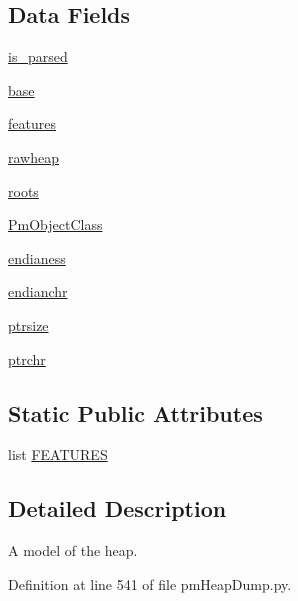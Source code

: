 \subsection*{Data Fields}
\begin{DoxyCompactItemize}
\item 
\hyperlink{classpm_heap_dump_1_1_pm_heap_a5eb881fccaa694956ede34deb4cd785c}{is\-\_\-parsed}
\item 
\hyperlink{classpm_heap_dump_1_1_pm_heap_a57ad2b4276dd1dd0ce0d2dd8dbd97d42}{base}
\item 
\hyperlink{classpm_heap_dump_1_1_pm_heap_a4252c452a05434c47cb8b24d99a1f642}{features}
\item 
\hyperlink{classpm_heap_dump_1_1_pm_heap_ad7b4a7d026b4c9c11361105a3390a932}{rawheap}
\item 
\hyperlink{classpm_heap_dump_1_1_pm_heap_a81d16782513bb112bc8de10f351f004e}{roots}
\item 
\hyperlink{classpm_heap_dump_1_1_pm_heap_a71cd0fd44f1be1820e74cb09163298e2}{Pm\-Object\-Class}
\item 
\hyperlink{classpm_heap_dump_1_1_pm_heap_a1e169147a7405dc3667f87fdac9f5141}{endianess}
\item 
\hyperlink{classpm_heap_dump_1_1_pm_heap_ab0eb6ed3da3e0658d955b1f090a64110}{endianchr}
\item 
\hyperlink{classpm_heap_dump_1_1_pm_heap_a4f9192405255b247b62a121118d6f72b}{ptrsize}
\item 
\hyperlink{classpm_heap_dump_1_1_pm_heap_a6f91a8f9776b91d20ff64f724dedd0b4}{ptrchr}
\end{DoxyCompactItemize}
\subsection*{Static Public Attributes}
\begin{DoxyCompactItemize}
\item 
list \hyperlink{classpm_heap_dump_1_1_pm_heap_a7f10bb7ecf23d67332c5b090b6ca58f1}{F\-E\-A\-T\-U\-R\-E\-S}
\end{DoxyCompactItemize}


\subsection{Detailed Description}
\begin{DoxyVerb}A model of the heap.
\end{DoxyVerb}
 

Definition at line 541 of file pm\-Heap\-Dump.\-py.



